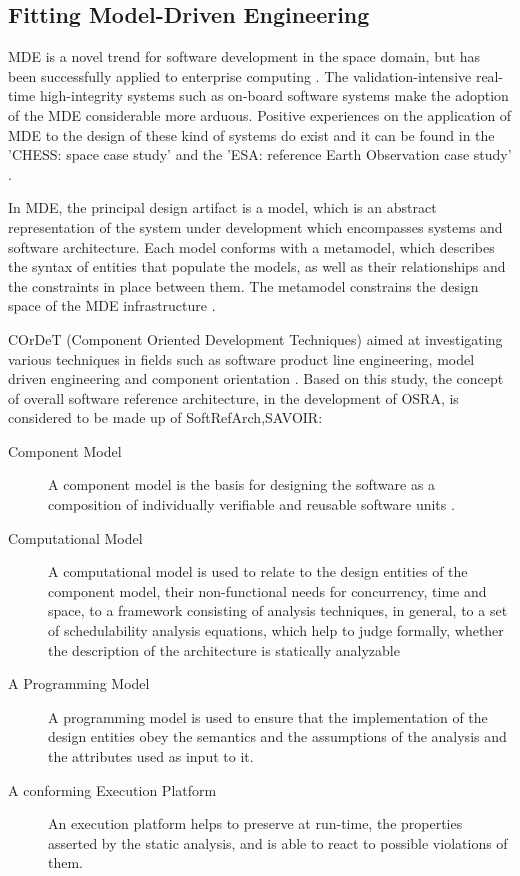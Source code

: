 \subsection{Fitting Model-Driven Engineering}
MDE is a novel trend for software development in the space domain, but has been successfully applied to enterprise computing \cite{CompBasedDev}. The validation-intensive real-time high-integrity systems such as on-board software systems make the adoption of the MDE considerable more arduous. Positive experiences on the application of MDE to the design of these kind of systems do exist and it can be found in the 'CHESS: space case study' \cite{CompBasedProcess} and the 'ESA: reference Earth Observation case study' \cite{CompBasedProcess}.

In MDE, the principal design artifact is a model, which is an abstract representation of the system under development which encompasses systems and software architecture. Each model conforms with a metamodel, which describes the syntax of entities that populate the models, as well as their relationships and the constraints in place between them. The metamodel constrains the design space of the MDE infrastructure \cite{Metamodelling}.  

COrDeT (Component Oriented Development Techniques) aimed at investigating various techniques in fields such as software product line engineering, model driven engineering and component orientation \cite{CORDET}. Based on this study, the concept of overall software reference architecture, in the development of OSRA, is considered to be made up of {SoftRefArch,SAVOIR}:

\begin{description}
\item [Component Model] A component model is the basis for designing the software as a composition of individually verifiable and reusable software units \cite{ComponentModel}.

\item [Computational Model] A computational model is used to relate to the design entities of the component model, their non-functional needs for concurrency, time and space, to a framework consisting of analysis techniques, in general, to a set of schedulability analysis equations, which help to judge formally, whether the description of the architecture is statically analyzable \cite{ScheduAnaly}

\item [A Programming Model] A programming model is used to ensure that the implementation of the design entities obey the semantics and the assumptions of the analysis and the attributes used as input to it.\cite{CharEvoRAVCodeAr}

\item [A conforming Execution Platform] An execution platform helps to preserve at run-time, the properties asserted by the static analysis, and is able to react to possible violations of them.  
\end{description}

